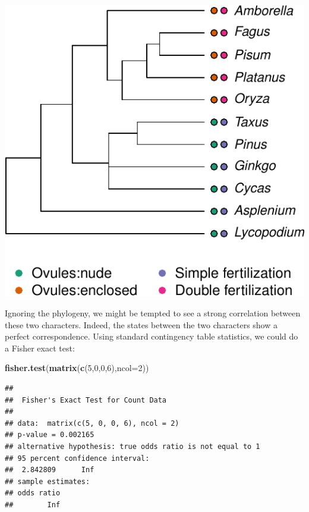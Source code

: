 \documentclass[
]{book}
\newenvironment{Shaded}{\begin{snugshade}}{\end{snugshade}}
\newcommand{\AttributeTok}[1]{\textcolor[rgb]{0.13,0.29,0.53}{#1}}
\newcommand{\DecValTok}[1]{\textcolor[rgb]{0.00,0.00,0.81}{#1}}
\newcommand{\FunctionTok}[1]{\textcolor[rgb]{0.13,0.29,0.53}{\textbf{#1}}}
\newcommand{\NormalTok}[1]{#1}
\begin{document}
\begin{center}\includegraphics{pcm-workshop_files/figure-latex/AngiospermsWithCharacters-1} \end{center}

Ignoring the phylogeny, we might be tempted to see a strong correlation between these two characters. Indeed, the states between the two characters show a perfect correspondence. Using standard contingency table statistics, we could do a Fisher exact test:

\begin{Shaded}
\begin{Highlighting}[]
\FunctionTok{fisher.test}\NormalTok{(}\FunctionTok{matrix}\NormalTok{(}\FunctionTok{c}\NormalTok{(}\DecValTok{5}\NormalTok{,}\DecValTok{0}\NormalTok{,}\DecValTok{0}\NormalTok{,}\DecValTok{6}\NormalTok{),}\AttributeTok{ncol=}\DecValTok{2}\NormalTok{))}
\end{Highlighting}
\end{Shaded}

\begin{verbatim}
## 
##  Fisher's Exact Test for Count Data
## 
## data:  matrix(c(5, 0, 0, 6), ncol = 2)
## p-value = 0.002165
## alternative hypothesis: true odds ratio is not equal to 1
## 95 percent confidence interval:
##  2.842809      Inf
## sample estimates:
## odds ratio 
##        Inf
\end{verbatim}
\end{document}
